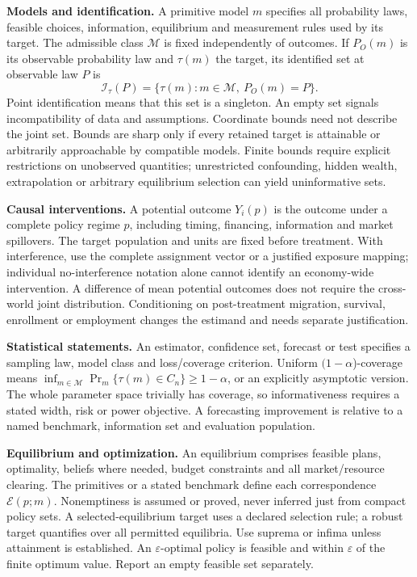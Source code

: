 \documentclass[11pt,a4paper]{article}
\begin{document}
\textbf{Models and identification.} A primitive model \(m\) specifies all probability laws, feasible choices, information, equilibrium and measurement rules used by its target. The admissible class \(\mathcal M\) is fixed independently of outcomes. If \(P_O(m)\) is its observable probability law and \(\tau(m)\) the target, its identified set at observable law \(P\) is
\[
 \mathcal I_\tau(P)=\{\tau(m):m\in\mathcal M,\ P_O(m)=P\}.
\]
Point identification means that this set is a singleton. An empty set signals incompatibility of data and assumptions. Coordinate bounds need not describe the joint set. Bounds are sharp only if every retained target is attainable or arbitrarily approachable by compatible models. Finite bounds require explicit restrictions on unobserved quantities; unrestricted confounding, hidden wealth, extrapolation or arbitrary equilibrium selection can yield uninformative sets.

\textbf{Causal interventions.} A potential outcome \(Y_i(p)\) is the outcome under a complete policy regime \(p\), including timing, financing, information and market spillovers. The target population and units are fixed before treatment. With interference, use the complete assignment vector or a justified exposure mapping; individual no-interference notation alone cannot identify an economy-wide intervention. A difference of mean potential outcomes does not require the cross-world joint distribution. Conditioning on post-treatment migration, survival, enrollment or employment changes the estimand and needs separate justification.

\textbf{Statistical statements.} An estimator, confidence set, forecast or test specifies a sampling law, model class and loss/coverage criterion. Uniform \((1-\alpha\))-coverage means \(\inf_{m\in\mathcal M}\Pr_m\{\tau(m)\in C_n\}\geq1-\alpha\), or an explicitly asymptotic version. The whole parameter space trivially has coverage, so informativeness requires a stated width, risk or power objective. A forecasting improvement is relative to a named benchmark, information set and evaluation population.

\textbf{Equilibrium and optimization.} An equilibrium comprises feasible plans, optimality, beliefs where needed, budget constraints and all market/resource clearing. The primitives or a stated benchmark define each correspondence \(\mathcal E(p;m)\). Nonemptiness is assumed or proved, never inferred just from compact policy sets. A selected-equilibrium target uses a declared selection rule; a robust target quantifies over all permitted equilibria. Use suprema or infima unless attainment is established. An \(\varepsilon\)-optimal policy is feasible and within \(\varepsilon\) of the finite optimum value. Report an empty feasible set separately.
\end{document}
